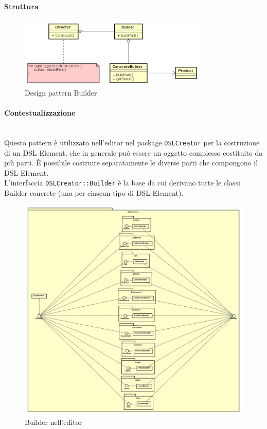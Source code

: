 \paragraph{Struttura}
\begin{figure}[H]
\centering
\includegraphics[width=0.8\textwidth]{res/sections/backend/builder.png}
\caption{Design pattern Builder}
\end{figure}
\paragraph{Contestualizzazione}\mbox{} \\
Questo pattern è utilizzato nell'editor nel package \texttt{DSLCreator} per la costruzione di un DSL Element, che in generale può essere un oggetto complesso costituito da più parti. È possibile costruire separatamente le diverse parti che compongono il DSL Element. \\ L'interfaccia \texttt{DSLCreator::Builder} è la base da cui derivano tutte le classi Builder concrete (una per ciascun tipo di DSL Element).
\begin{figure}[H]
\centering
\includegraphics[width=1.0\textwidth]{res/sections/frontend/builder_editor.png}
\caption{Builder nell'editor}
\end{figure}
